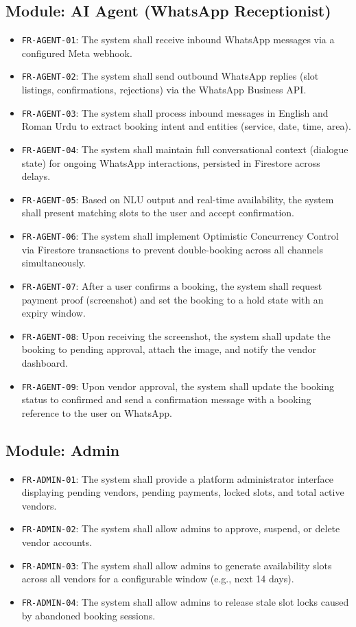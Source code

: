\subsection{Module: AI Agent (WhatsApp Receptionist)}
\begin{itemize}
  \item \texttt{FR-AGENT-01}: The system shall receive inbound WhatsApp messages via a configured Meta webhook.
  \item \texttt{FR-AGENT-02}: The system shall send outbound WhatsApp replies (slot listings, confirmations, rejections) via the WhatsApp Business API.
  \item \texttt{FR-AGENT-03}: The system shall process inbound messages in English and Roman Urdu to extract booking intent and entities (service, date, time, area).
  \item \texttt{FR-AGENT-04}: The system shall maintain full conversational context (dialogue state) for ongoing WhatsApp interactions, persisted in Firestore across delays.
  \item \texttt{FR-AGENT-05}: Based on NLU output and real-time availability, the system shall present matching slots to the user and accept confirmation.
  \item \texttt{FR-AGENT-06}: The system shall implement Optimistic Concurrency Control via Firestore transactions to prevent double-booking across all channels simultaneously.
  \item \texttt{FR-AGENT-07}: After a user confirms a booking, the system shall request payment proof (screenshot) and set the booking to a hold state with an expiry window.
  \item \texttt{FR-AGENT-08}: Upon receiving the screenshot, the system shall update the booking to pending approval, attach the image, and notify the vendor dashboard.
  \item \texttt{FR-AGENT-09}: Upon vendor approval, the system shall update the booking status to confirmed and send a confirmation message with a booking reference to the user on WhatsApp.
\end{itemize}

\subsection{Module: Admin}
\begin{itemize}
  \item \texttt{FR-ADMIN-01}: The system shall provide a platform administrator interface displaying pending vendors, pending payments, locked slots, and total active vendors.
  \item \texttt{FR-ADMIN-02}: The system shall allow admins to approve, suspend, or delete vendor accounts.
  \item \texttt{FR-ADMIN-03}: The system shall allow admins to generate availability slots across all vendors for a configurable window (e.g., next 14 days).
  \item \texttt{FR-ADMIN-04}: The system shall allow admins to release stale slot locks caused by abandoned booking sessions.
\end{itemize}

